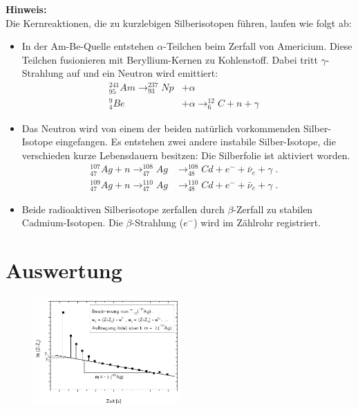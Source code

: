 \noindent
\textbf{Hinweis:}\\
Die Kernreaktionen, die zu kurzlebigen Silberisotopen führen, laufen wie folgt ab:
\begin{itemize}
	\item In der Am-Be-Quelle entstehen $\alpha$-Teilchen beim Zerfall von Americium. Diese Teilchen fusionieren mit Beryllium-Kernen zu Kohlenstoff. Dabei tritt $\gamma$-Strahlung auf und ein Neutron wird emittiert:
		\begin{align*}
			^{241}_{95}Am \rightarrow ^{237}_{93}Np & + \alpha &\\
			^9_4 Be & + \alpha \rightarrow ^{12}_6C + n + \gamma
		\end{align*}
	\item Das Neutron wird von einem der beiden natürlich vorkommenden Silber-Isotope eingefangen. Es entstehen zwei andere instabile Silber-Isotope, die verschieden kurze Lebensdauern besitzen: Die Silberfolie ist aktiviert worden.
		\begin{align*}
			^{107}_{47}Ag + n \rightarrow ^{108}_{47}Ag & \rightarrow ^{108}_{48}Cd + e^- + \bar{\nu}_e + \gamma \; . &\\
			^{109}_{47}Ag + n \rightarrow ^{110}_{47}Ag & \rightarrow ^{110}_{48}Cd + e^- + \bar{\nu}_e + \gamma \; .
		\end{align*}
	\item Beide radioaktiven Silberisotope zerfallen durch $\beta$-Zerfall zu stabilen Cadmium-Isotopen. Die $\beta$-Strahlung ($e^-$) wird im Zählrohr registriert.
\end{itemize}

\section{Auswertung} 

\begin{figure}[h]
	\centering
		\includegraphics[width=0.5\textwidth]{Versuch_19-20/Abbildungen/Bestimmung_Halbwertszeiten.jpg}
	\label{fig:Bestimmung_Halbwertszeiten}
\end{figure}

